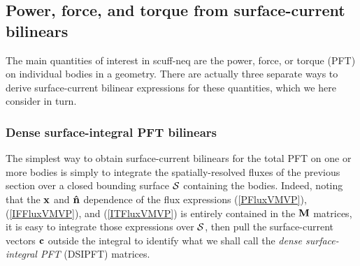 \documentclass[letterpaper]{article}
\begin{document}
\subsection*{Power, force, and torque from surface-current bilinears}

The main quantities of interest in {\sc scuff-neq} are the
power, force, or torque (PFT) on individual bodies in a geometry.
There are actually three separate ways to derive surface-current 
bilinear expressions for these quantities, which we here consider 
in turn.

\subsubsection*{Dense surface-integral PFT bilinears}

The simplest way to obtain surface-current bilinears for the
total PFT on one or more bodies is simply to integrate the 
spatially-resolved fluxes of the previous section over a closed
bounding surface $\mathcal{S}$ containing the bodies.
Indeed, noting that the $\mathbf{x}$ and $\mathbf{\hat n}$ dependence of
the flux expressions (\ref{PFluxVMVP}), (\ref{IFFluxVMVP}),
and (\ref{ITFluxVMVP}) is entirely contained in the $\mathbf{M}$
matrices, it is easy to integrate those expressions over
$\mathcal{S}$, then pull the surface-current vectors $\mathbf{c}$
outside the integral to identify what we shall call
the \textit{dense surface-integral PFT} (DSIPFT) matrices. 
\end{document}
